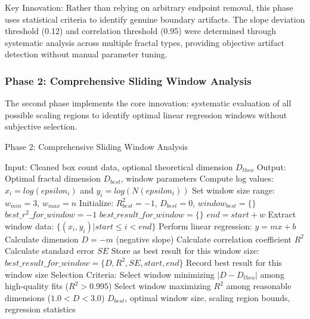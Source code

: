 \documentclass[preprint,12pt]{elsarticle}
\def\textbf#1{#1}%
\def\log{log}%
\def\epsilon{epsilon}%
\begin{document}
\textbf{Key Innovation}: Rather than relying on arbitrary endpoint removal, this phase uses statistical criteria to identify genuine boundary artifacts. The slope deviation threshold (0.12) and correlation threshold (0.95) were determined through systematic analysis across multiple fractal types, providing objective artifact detection without manual parameter tuning.

\subsubsection{Phase 2: Comprehensive Sliding Window Analysis}

The second phase implements the core innovation: systematic evaluation of all possible scaling regions to identify optimal linear regression windows without subjective selection.

\begin{algorithm}[H]
\caption{Phase 2: Comprehensive Sliding Window Analysis}
\begin{algorithmic}[1]
\small
\State \textbf{Input:} Cleaned box count data, optional theoretical dimension $D_{theo}$
\State \textbf{Output:} Optimal fractal dimension $D_{best}$, window parameters
\State
\State Compute log values: $x_i = \log(\epsilon_i)$ and $y_i = \log(N(\epsilon_i))$
\State Set window size range: $w_{min} = 3$, $w_{max} = n$
\State Initialize: $R^2_{best} = -1$, $D_{best} = 0$, $window_{best} = \{\}$
\State
{}
    \State $best\_r^2\_for\_window = -1$
    \State $best\_result\_for\_window = \{\}$
    \State
        \State $end = start + w$
        \State Extract window data: $\{(x_i, y_i) | start \leq i < end\}$
        \State
        \State Perform linear regression: $y = mx + b$
        \State Calculate dimension $D = -m$ (negative slope)
        \State Calculate correlation coefficient $R^2$
        \State Calculate standard error $SE$
        \State
            \State Store as best result for this window size:
            \State $best\_result\_for\_window = \{D, R^2, SE, start, end\}$
        \EndIf
    \EndFor
    \State
    \State Record best result for this window size
\EndFor
\State
\State \textbf{Selection Criteria:}
    \State Select window minimizing $|D - D_{theo}|$ among high-quality fits ($R^2 > 0.995$)
\Else
    \State Select window maximizing $R^2$ among reasonable dimensions ($1.0 < D < 3.0$)
\EndIf
\State
\State \Return $D_{best}$, optimal window size, scaling region bounds, regression statistics
\end{algorithmic}
\end{algorithm}
\end{document}
